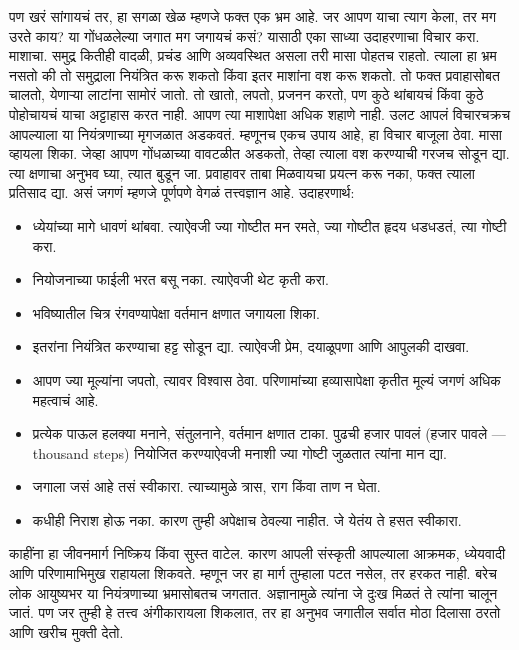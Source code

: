 पण खरं सांगायचं तर, हा सगळा खेळ म्हणजे फक्त एक भ्रम आहे. जर आपण याचा त्याग केला, तर मग उरते काय? या गोंधळलेल्या जगात मग जगायचं कसं?
यासाठी एका साध्या उदाहरणाचा विचार करा. माशाचा. समुद्र कितीही वादळी, प्रचंड आणि अव्यवस्थित असला तरी मासा पोहतच राहतो. त्याला हा भ्रम नसतो की तो समुद्राला नियंत्रित करू शकतो किंवा इतर माशांना वश करू शकतो. तो फक्त प्रवाहासोबत चालतो, येणाऱ्या लाटांना सामोरं जातो. तो खातो, लपतो, प्रजनन करतो, पण कुठे थांबायचं किंवा कुठे पोहोचायचं याचा अट्टाहास करत नाही.
आपण त्या माशापेक्षा अधिक शहाणे नाही. उलट आपलं विचारचक्रच आपल्याला या नियंत्रणाच्या मृगजळात अडकवतं. म्हणूनच एकच उपाय आहे,  हा विचार बाजूला ठेवा. मासा व्हायला शिका.
जेव्हा आपण गोंधळाच्या वावटळीत अडकतो, तेव्हा त्याला वश करण्याची गरजच सोडून द्या. त्या क्षणाचा अनुभव घ्या, त्यात बुडून जा. प्रवाहावर ताबा मिळवायचा प्रयत्न करू नका, फक्त त्याला प्रतिसाद द्या.
असं जगणं म्हणजे पूर्णपणे वेगळं तत्त्वज्ञान आहे. उदाहरणार्थ:
\begin{itemize}
\item ध्येयांच्या मागे धावणं थांबवा. त्याऐवजी ज्या गोष्टीत मन रमते, ज्या गोष्टीत हृदय धडधडतं, त्या गोष्टी करा.
\item नियोजनाच्या फाईली भरत बसू नका. त्याऐवजी थेट कृती करा.
\item भविष्यातील चित्र रंगवण्यापेक्षा वर्तमान क्षणात जगायला शिका.
\item इतरांना नियंत्रित करण्याचा हट्ट सोडून द्या. त्याऐवजी प्रेम, दयाळूपणा आणि आपुलकी दाखवा.
\item आपण ज्या मूल्यांना जपतो, त्यावर विश्वास ठेवा. परिणामांच्या हव्यासापेक्षा कृतीत मूल्यं जगणं अधिक महत्वाचं आहे.
\item प्रत्येक पाऊल हलक्या मनाने, संतुलनाने, वर्तमान क्षणात टाका. पुढची हजार पावलं (हजार पावले — thousand steps) नियोजित करण्याऐवजी मनाशी ज्या गोष्टी जुळतात त्यांना मान द्या.
\item जगाला जसं आहे तसं स्वीकारा. त्याच्यामुळे त्रास, राग किंवा ताण न घेता.
\item कधीही निराश होऊ नका. कारण तुम्ही अपेक्षाच ठेवल्या नाहीत. जे येतंय ते हसत स्वीकारा.
\end{itemize}
काहींना हा जीवनमार्ग निष्क्रिय किंवा सुस्त वाटेल. कारण आपली संस्कृती आपल्याला आक्रमक, ध्येयवादी आणि परिणामाभिमुख राहायला शिकवते. म्हणून जर हा मार्ग तुम्हाला पटत नसेल, तर हरकत नाही. बरेच लोक आयुष्यभर या नियंत्रणाच्या भ्रमासोबतच जगतात. अज्ञानामुळे त्यांना जे दुःख मिळतं ते त्यांना चालून जातं.
पण जर तुम्ही हे तत्त्व अंगीकारायला शिकलात, तर हा अनुभव जगातील सर्वात मोठा दिलासा ठरतो आणि खरीच मुक्ती देतो.

